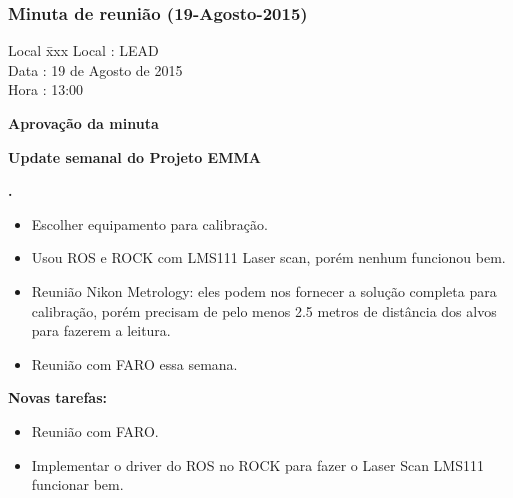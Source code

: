 \subsubsection{Minuta de reunião (19-Agosto-2015)}

\begin{tabbing}
  Local \= xxx \kill
  Local \> : LEAD \\
  Data  \> : 19 de Agosto de 2015 \\
  Hora  \> : 13:00
\end{tabbing}


\textbf{Aprovação da minuta}

\textbf{Update semanal do Projeto EMMA}
   							
					
\textbf{\gabriel.} 
	\begin{itemize}
		\item Escolher equipamento para calibração.
				\item Usou ROS e ROCK com LMS111 Laser scan, porém nenhum funcionou bem.
				\item Reunião Nikon Metrology: eles podem nos fornecer a solução completa
				para calibração, porém precisam de pelo menos 2.5 metros de distância
				dos alvos para fazerem a leitura.
				\item Reunião com FARO essa semana.
			\end{itemize}
		
		\item \textbf{Novas tarefas:}
			\begin{itemize} 
				\item Reunião com FARO.
				\item Implementar o driver do ROS no ROCK para fazer o Laser Scan LMS111
				funcionar bem.
			\end{itemize}

					
			
